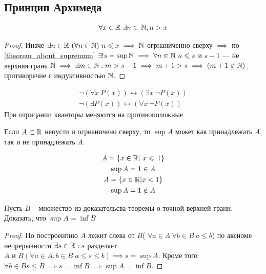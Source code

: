  \subsection{Принцип Архимеда}
 \begin{theorem}\label{Archemedian_principle}
   \begin{gather}
    \forall x \in \mathbb{R}\ \exists n \in\, \mathbb{N}, n > x
   \end{gather}
 \end{theorem}\begin{proof}
    Иначе $ \exists n \in \R \ (\forall  n \in \N) \ n \leq  x \implies \N $ огрнаниченно сверху $ \implies  $ по 
    \ref{theorem_about_supremum} $ \exists ! s = \sup \mathbb{N}  \implies \forall n \in \mathbb{N}\ n \leqslant  s $ и $ s - 1 $ --- не верхняя грань $ \mathbb{N} \implies  \exists m \in  \mathbb{N}: m > s - 1 \implies m + 1 > s \implies  (m + 1 \notin \mathbb{N})$,
    противоречие с индуктивностью $ \mathbb{N} $. 
 \end{proof}
\begin{note}
    \begin{gather}
        \lnot (\forall x \ P(x)) \longleftrightarrow (\exists x \ \lnot P(x)) \\
        \lnot (\exists P(x)) \longleftrightarrow (\forall x \ \lnot P(x))
    \end{gather}
    При отрицании кванторы меняются на противоположные.
\end{note}
\begin{note}
    Если $ A \subset \mathbb{R} $ непусто и огрнаничено сверху, то $ \sup A $ может как принадлежать $ A $,
    так и не принадлежать $ A $.
\end{note}
\begin{example}
    \begin{gather}
        A = \{x \in \mathbb{R}|\ x \leqslant\, 1\} \\
        \sup A = 1 \in A \\
        A = \{x \in \mathbb{R} | x < 1\} \\
        \sup A = 1 \notin A
    \end{gather}
\end{example}
\begin{exercise}
    Пусть $ B $ -- множество из доказательсва теоремы о точной верхней грани. Доказать, что $ \sup A = \inf B $
\end{exercise} \begin{proof}
    По построенпию $ A $ лежит слева от $ B $( $ \forall a \in  A\ \forall b \in  B \ a  \leq  b $)
   по аксиоме непрерывности $ \exists  s \in \mathbb{R}: s $ разделяет $ A \text{  и } B( \forall a \in A, b \in B\; a \leq s \leq b) \implies s = \sup A $. Кроме того $ \forall b \in B s \leq  B \implies  s = \inf B \implies \sup A = \inf B $.
\end{proof}
